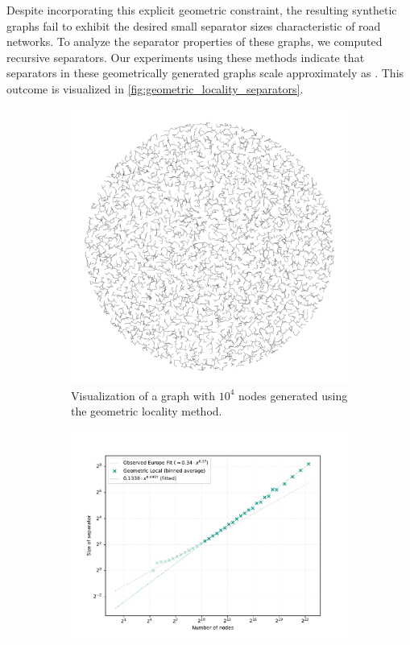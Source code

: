 Despite incorporating this explicit geometric constraint, the resulting synthetic graphs fail to exhibit the desired small separator sizes characteristic of road networks.
To analyze the separator properties of these graphs, we computed recursive separators.
Our experiments using these methods indicate that separators in these geometrically generated graphs scale approximately as .
This outcome is visualized in \cref{fig:geometric_locality_separators}.

\begin{figure}[tbhp]
	\begin{subfigure}{0.35\linewidth}
		\centering
		\includegraphics[width=\linewidth]{graphics/local_embedding.png}
		\caption{Visualization of a graph with \(10^4\) nodes generated using the geometric locality method.}
		\label{fig:geometric_locality_graph_viz}
	\end{subfigure}
	\hfill
	\begin{subfigure}{0.55\linewidth}
		\centering
		\includegraphics[width=\linewidth]{graphics/sep_local_embedding.pdf}

\end{subfigure}
\end{figure}
